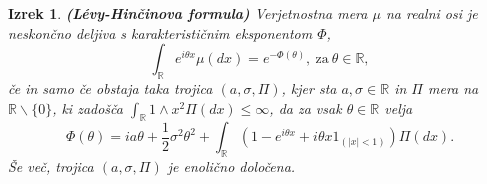 \documentclass[]{beamer} %
\theoremstyle{plain}
\newtheorem{izrek}{Izrek}
\begin{document}
\begin{frame}
  \begin{izrek}
    \textbf{(Lévy-Hinčinova formula)} Verjetnostna mera $\mu$ na realni osi je neskončno deljiva s 
    karakterističnim eksponentom $\Phi$,
    $$
    \int_{\mathbb{R}} e^{i\theta x} \mu(dx) = e^{-\Phi(\theta)},\ \text{za} \ \theta \in \mathbb{R},
    $$
    če in samo če obstaja taka trojica $(a, \sigma, \Pi)$, kjer sta $a, \sigma \in \mathbb{R}$ in $\Pi$
    mera na $\mathbb{R}\backslash\{0\}$, ki zadošča $\int_{\mathbb{R}}1 \wedge x^2 \Pi(dx)\leq \infty$, 
    da za vsak $\theta \in \mathbb{R}$ velja
    $$
    \Phi(\theta) = ia\theta + \frac{1}{2}\sigma^2\theta^2 + \int_{\mathbb{R}}(1 - e^{i\theta x} + i\theta x {1}_{(|x|<1)})\Pi(dx).
    $$
    Še več, trojica $(a, \sigma, \Pi)$ je enolično določena.
  \end{izrek}
\end{frame}
\end{document}
